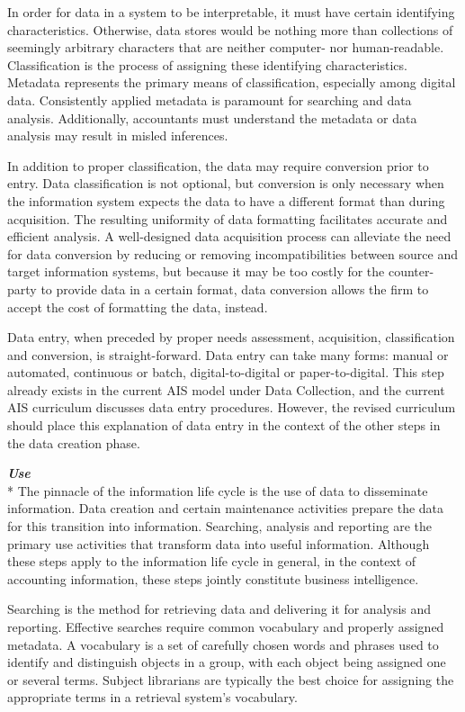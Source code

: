 \documentclass[12pt]{article}
\newcommand{\SubSubSection}[1]{{\centering{}\normalsize{}\textbf{\emph{#1}}}\\*\indent{}}
\begin{document}
In order for data in a system to be interpretable, it must have certain identifying characteristics. Otherwise, data stores would be nothing more than collections of seemingly arbitrary characters that are neither computer- nor human-readable. Classification is the process of assigning these identifying characteristics. Metadata represents the primary means of classification, especially among digital data. Consistently applied metadata is paramount for searching and data analysis. Additionally, accountants must understand the metadata or data analysis may result in misled inferences.

In addition to proper classification, the data may require conversion prior to entry. Data classification is not optional, but conversion is only necessary when the information system expects the data to have a different format than during acquisition. The resulting uniformity of data formatting facilitates accurate and efficient analysis. A well-designed data acquisition process can alleviate the need for data conversion by reducing or removing incompatibilities between source and target information systems, but because it may be too costly for the counter-party to provide data in a certain format, data conversion allows the firm to accept the cost of formatting the data, instead.

Data entry, when preceded by proper needs assessment, acquisition, classification and conversion, is straight-forward. Data entry can take many forms: manual or automated, continuous or batch, digital-to-digital or paper-to-digital. This step already exists in the current AIS model under Data Collection, and the current AIS curriculum discusses data entry procedures. However, the revised curriculum should place this explanation of data entry in the context of the other steps in the data creation phase.

\SubSubSection{Use}
The pinnacle of the information life cycle is the use of data to disseminate information. Data creation and certain maintenance activities prepare the data for this transition into information. Searching, analysis and reporting are the primary use activities that transform data into useful information. Although these steps apply to the information life cycle in general, in the context of accounting information, these steps jointly constitute business intelligence.

Searching is the method for retrieving data and delivering it for analysis and reporting. Effective searches require common vocabulary and properly assigned metadata. A vocabulary is a set of carefully chosen words and phrases used to identify and distinguish objects in a group, with each object being assigned one or several terms. Subject librarians are typically the best choice for assigning the appropriate terms in a retrieval system's vocabulary.
\end{document}
